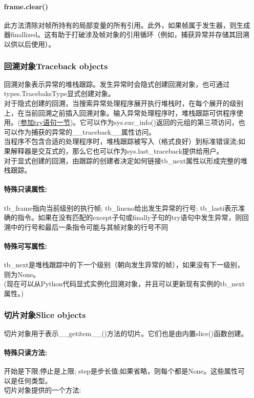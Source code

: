 \documentclass[10pt,UTF8]{ctexart}
\begin{document}
\begin{flushleft}
\paragraph{frame.clear()}此方法清除对帧所持有的局部变量的所有引用。此外，如果帧属于发生器，则生成器finallized。这有助于打破涉及帧对象的引用循环（例如，捕获异常并存储其回溯以供以后使用）。
\subsubsection{回溯对象Traceback objects}
回溯对象表示异常的堆栈跟踪。发生异常时会隐式创建回溯对象，也可通过types.TracebaksType显式创建对象。\\
\indent 对于隐式创建的回溯，当搜索异常处理程序展开执行堆栈时，在每个展开的级别上，在当前回溯之前插入回溯对象。输入异常处理程序时，堆栈跟踪可供程序使用。(\href{https://docs.python.org/3/reference/compound_stmts.html#try}{参加try语句一节})。它可以作为sys.exc_info()返回的元组的第三项访问，也可以作为捕获的异常的__traceback__属性访问。\\
\indent 当程序不包含合适的处理程序时，堆栈跟踪被写入（格式良好）到标准错误流;如果解释器是交互式的，那么它也可以作为sys.last_traceback提供给用户。\\
\indent 对于显式创建的回溯，由跟踪的创建者决定如何链接tb_next属性以形成完整的堆栈跟踪。
\paragraph{特殊只读属性:} tb_frame指向当前级别的执行帧; tb_lineno给出发生异常的行号; tb_lasti表示准确的指令。如果在没有匹配的except子句或finally子句的try语句中发生异常，则回溯中的行号和最后一条指令可能与其帧对象的行号不同
\paragraph{特殊可写属性:}tb_next是堆栈跟踪中的下一个级别（朝向发生异常的帧），如果没有下一级别，则为None。\\
\indent (现在可以从Python代码显式实例化回溯对象，并且可以更新现有实例的tb_next属性。)
\subsubsection{切片对象Slice objects}
切片对象用于表示__getitem__()方法的切片。它们也是由内置slice()函数创建。
\paragraph{特殊只读方法:}开始是下限;停止是上限; step是步长值;如果省略，则每个都是None。这些属性可以是任何类型。\\
\indent 切片对象提供的一个方法:

\end{flushleft}
\end{document}
